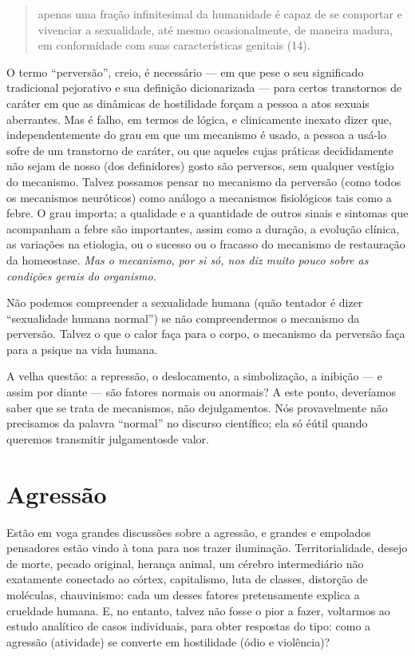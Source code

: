 \begin{quote}
apenas uma fração infinitesimal da humanidade é capaz
de se comportar e vivenciar a sexualidade, até mesmo ocasionalmente, de
maneira madura, em conformidade com suas características
genitais (14).
\end{quote}

O termo ``perversão'', creio, é
necessário --- em que pese o seu significado tradicional pejorativo e
sua definição dicionarizada --- para certos transtornos de caráter em
que as dinâmicas de hostilidade\idxhost{} forçam a pessoa a atos sexuais
aberrantes. Mas é falho, em termos de lógica, e clinicamente inexato
dizer que, independentemente do grau em que um mecanismo é usado, a
pessoa a usá-lo sofre de um transtorno de caráter, ou que aqueles cujas
práticas decididamente não sejam de nosso (dos definidores) gosto são
perversos, sem qualquer vestígio do mecanismo. Talvez possamos pensar
no mecanismo da perversão (como todos os mecanismos neuróticos) como
análogo a mecanismos fisiológicos tais como a febre. O grau importa; a
qualidade e a quantidade de outros sinais e sintomas que acompanham a
febre são importantes, assim como a duração, a evolução clínica, as
variações na etiologia, ou o sucesso ou o fracasso do mecanismo de
restauração da homeostase. \textit{Mas o mecanismo, por si só, nos diz
muito pouco sobre as condições gerais do organismo.}

Não podemos compreender a sexualidade humana (quão tentador é dizer
``sexualidade humana normal'') se não
compreendermos o mecanismo da perversão. Talvez o que o calor faça para
o corpo, o mecanismo da perversão faça para a psique na vida humana.

A velha questão: a repressão, o deslocamento, a simbolização, a
inibição --- e assim por diante --- são fatores normais ou anormais?
A este ponto, deveríamos saber que se trata de mecanismos, não de\idxmecap[|)]
julgamentos. Nós provavelmente não precisamos da palavra
``normal'' no discurso científico; ela só é\idxpervnorma[|)]
útil quando queremos transmitir julgamentos\idxnorma[|)] de valor.



\section{Agressão}


Estão em voga grandes discussões sobre a agressão,\idxagres{} e grandes e
empolados pensadores estão vindo à tona para nos trazer iluminação.
Territorialidade, desejo de morte, pecado original, herança animal, um
cérebro intermediário não exatamente conectado ao córtex, capitalismo,
luta de classes, distorção de moléculas, chauvinismo: cada um
desses fatores pretensamente explica a crueldade humana. E, no entanto,
talvez não fosse o pior a fazer, voltarmos ao estudo analítico de casos
individuais, para obter respostas do tipo: como a agressão (atividade)
se converte em hostilidade (ódio e violência)?

